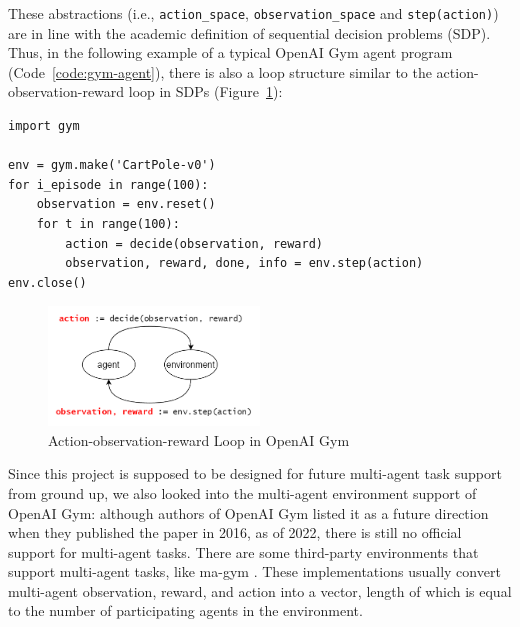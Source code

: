 These abstractions (i.e., \texttt{action\_space}, \texttt{observation\_space} and \texttt{step(action)}) are in line with the academic definition of sequential decision problems (SDP). Thus, in the following example of a typical OpenAI Gym agent program (Code~\ref{code:gym-agent}), there is also a loop structure similar to the action-observation-reward loop in SDPs (Figure~\ref{fig:openai-gym-obr-loop}):

\begin{code}
\begin{verbatim}
import gym

env = gym.make('CartPole-v0')
for i_episode in range(100):
    observation = env.reset()
    for t in range(100):
        action = decide(observation, reward)
        observation, reward, done, info = env.step(action)
env.close()
\end{verbatim}
\label{code:gym-agent}
\end{code}

\begin{figure}[H]
    \centering
    \includegraphics[width=0.5\textwidth]{images/openai-gym-obr-loop.png}
    \caption{Action-observation-reward Loop in OpenAI Gym}
    \label{fig:openai-gym-obr-loop}
\end{figure}

Since this project is supposed to be designed for future multi-agent task support from ground up, we also looked into the multi-agent environment support of OpenAI Gym: although authors of OpenAI Gym listed it as a future direction when they published the paper in 2016, as of 2022, there is still no official support for multi-agent tasks. There are some third-party environments that support multi-agent tasks, like ma-gym \parencite{magym}. These implementations usually convert multi-agent observation, reward, and action into a vector, length of which is equal to the number of participating agents in the environment.

